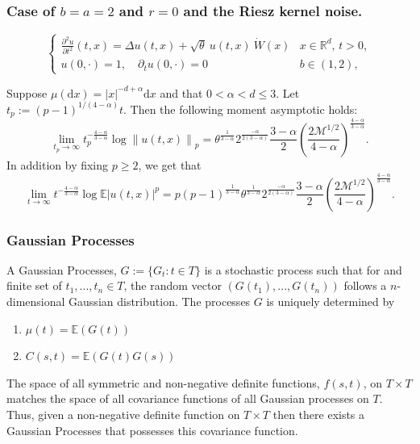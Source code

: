 \documentclass{beamer}
\numberwithin{equation}{section}
\newcommand{\R}{\mathbb{R}}
\newcommand{\E}{\mathbb{E}}
\newcommand{\Norm}[1]{\left\|  #1   \right\|}
\newcommand{\ud}{\ensuremath{\mathrm{d}}}
\begin{document}
	\begin{frame}[t]
		\frametitle{Case of $b=a=2$ and $r=0$ and the Riesz kernel noise.}
		
		\begin{equation*}
		\begin{cases}
		\frac{\partial^2 u}{\partial t^2}(t,x) = \Delta u(t,x) + \sqrt{\theta}\: u(t,x)\: \dot W(x) & \text{$x\in \R^d$, $t>0$}, \\
		
		u(0,\cdot) = 1, \quad \partial_t u(0,\cdot) = 0                                                                            & b \in (1,2),
		\end{cases}
		\end{equation*}
		
		\begin{theorem}
			Suppose $\mu(\ud x) = |x|^{-d+\alpha} \ud x$ and that $0 < \alpha < d \le 3$. Let $t_p:=(p-1)^{1/(4-\alpha)}t$. Then the following moment asymptotic holds:
			\[
			\lim_{t_p \to \infty} t_p^{-\frac{4-\alpha}{3-\alpha}} \log \Norm{u(t,x)}_p = \theta^{\frac{1}{3-\alpha}} 2^{\frac{-\alpha}{2(3-\alpha)}} \frac{3- \alpha}{2} \left( \frac{2 \mathcal{M}^{1/2}}{4-\alpha} \right)^{\frac{4-\alpha}{3-\alpha}}.
			\]
			In addition by fixing $p\ge 2$, we get that 
			\[
			\lim_{t \to \infty} t^{-\frac{4-\alpha}{3-\alpha}} \log \mathbb{E}|u(t,x)|^p =p(p-1)^{\frac{1}{3-\alpha}} \theta^{\frac{1}{3-\alpha}} 2^{\frac{-\alpha}{2(3-\alpha)}} \frac{3- \alpha}{2} \left( \frac{2 \mathcal{M}^{1/2}}{4-\alpha} \right)^{\frac{4-\alpha}{3-\alpha}}.
			\]
		\end{theorem}
	\end{frame}
	
	\begin{frame}[t]
		\frametitle{Gaussian Processes}
		
		A Gaussian Processes, $G := \{G_t : t \in T\}$ is a stochastic process such that for and finite set of $t_1,...,t_n \in T$, the random vector $(G(t_1),...,G(t_n))$ follows a $n$-dimensional Gaussian distribution. The processes $G$ is uniquely determined by
		\begin{enumerate}
			\item $\mu(t) = \E(G(t))$
			\item $C(s,t) = \E(G(t)G(s))$
		\end{enumerate}
		
		\begin{theorem}[Important]
			The space of all symmetric and non-negative definite functions, $f(s,t)$, on $T\times T$ matches the space of all covariance functions of all Gaussian processes on $T$. Thus, given a non-negative definite function on $T \times T$ then there exists a Gaussian Processes that possesses this covariance function.
		\end{theorem}
	\end{frame}
	
\end{document}

